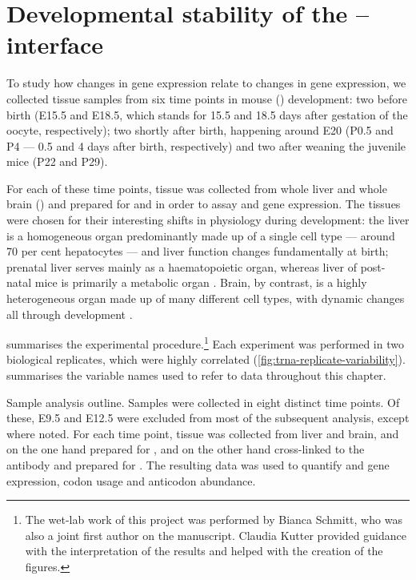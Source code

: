 \chapter{Developmental stability of the -- interface}
\label{sec:trna}

To study how changes in \mrna gene expression relate to changes in \trna gene
expression, we collected tissue samples from six time points in mouse (\mmu)
development: two before birth (E15.5 and E18.5, which stands for \num{15.5} and
\num{18.5} days after gestation of the oocyte, respectively); two shortly after
birth, happening around E20 (P0.5 and P4 --- \num{0.5} and \num{4} days after
birth, respectively) and two after weaning the juvenile mice (P22 and P29).

For each of these time points, tissue was collected from whole liver and whole
brain () and prepared for \rnaseq and  \chipseq in order to
assay \mrna and \trna gene expression. The tissues were chosen for their
interesting shifts in physiology during development: the liver is a homogeneous
organ predominantly made up of a single cell type --- around \num{70} per cent
hepatocytes --- and liver function changes fundamentally at birth; prenatal
liver serves mainly as a haematopoietic organ, whereas liver of post-natal mice
is primarily a metabolic organ \citep{Si-Tayeb:2010}. Brain, by contrast, is a
highly heterogeneous organ made up of many different cell types, with dynamic
changes all through development \citep{Liscovitch:2013}.

 summarises the experimental
procedure.\footnote{The wet-lab work of this project was performed by Bianca
Schmitt, who was also a joint first author on the manuscript. Claudia Kutter
provided guidance with the interpretation of the results and helped with the
creation of the figures.} Each experiment was performed in two biological
replicates, which were highly correlated
(\cref{fig:trna-replicate-variability}).  summarises the
variable names used to refer to data throughout this chapter.

    {Sample analysis outline.}
    {Samples were collected in eight distinct time points. Of these, E9.5 and
    E12.5 were excluded from most of the subsequent analysis, except where
    noted. For each time point, tissue was collected from liver and brain, and
    on the one hand prepared for \rnaseq, and on the other hand cross-linked to
    the  antibody and prepared for \chipseq. The resulting data was used to
    quantify \mrna and \trna gene expression, codon usage and \trna anticodon
    abundance.}

